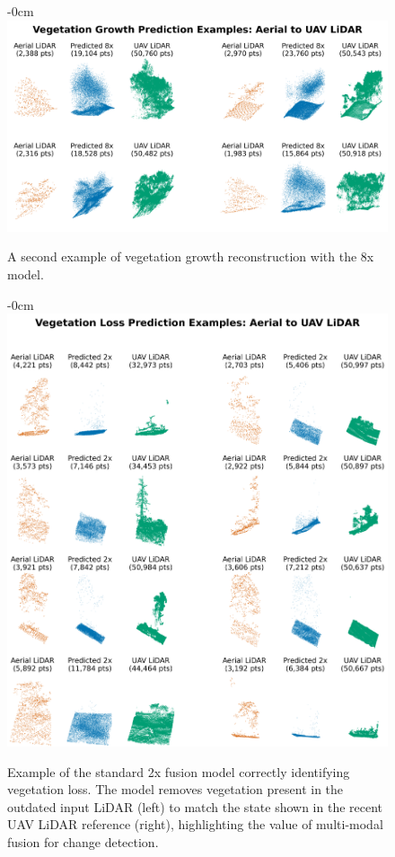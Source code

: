 \documentclass[remotesensing,article,submit,pdftex,moreauthors]{Definitions/mdpi}
\newenvironment{widefigure}[1][]{%
  \begin{figure}[#1]\begin{adjustwidth}{-\extralength}{0cm}\centering}{%
  \end{adjustwidth}\end{figure}}
\begin{document}
\begin{widefigure}[H]
    \centering
    \includegraphics[width=1\linewidth]{manuscript/figures/veg_growth2_8x.png}
    \caption{A second example of vegetation growth reconstruction with the 8x model.}
    \label{fig:appendix_growth2}
\end{widefigure}

\begin{widefigure}[H]
    \centering
    \includegraphics[width=1\linewidth]{manuscript/figures/veg_loss_2x.png}
    \caption{Example of the standard 2x fusion model correctly identifying vegetation loss. The model removes vegetation  present in the outdated input LiDAR (left) to match the  state shown in the recent UAV LiDAR reference (right), highlighting the value of multi-modal fusion for change detection.}
   \label{fig:appendix_loss}
\end{widefigure}
\end{document}
